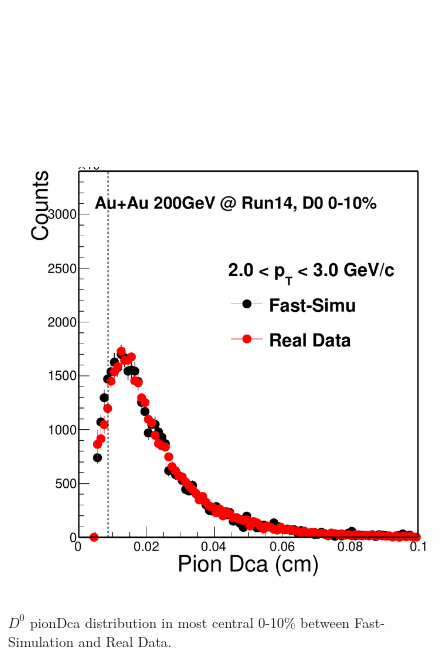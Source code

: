 \begin{figure}[htbp]
\begin{minipage}[htbp]{0.52\linewidth}
\centering
\includegraphics[width=1.0\textwidth,angle=0]{figure/Run14_D0HFT/pionDca.pdf}
\caption{ $D^0$ pionDca distribution in most central 0-10\% between Fast-Simulation and Real Data. \label{pionDca}}
\end{minipage}
\hfill
\begin{minipage}[htbp]{0.52\linewidth}
\centering

\end{minipage}
\end{figure}
